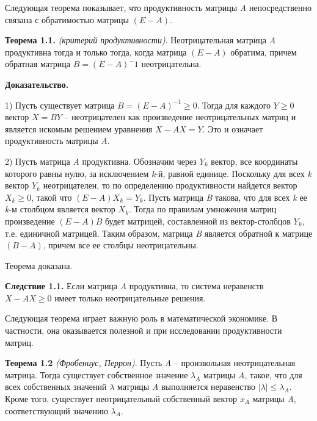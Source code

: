 \documentclass[12pt, 4paper]{book}
\begin{document}
{Следующая теорема показывает, что продуктивность матрицы \textit{A} непосредственно связана с обратимостью матрицы $ (E - A) $.
\par

\textbf{Теорема 1.1.} \textit{(критерий продуктивности)}. Неотрицательная матрица \textit{A} продуктивна тогда и только тогда, когда матрица $ (E - A) $ обратима, причем обратная матрица $ B = (E - A)^-1 $ неотрицательна.
\par

\textbf{Доказательство.} 
\par

1) Пусть существует матрица $ B = (E - A)^{-1} \geq 0$. Тогда для каждого $ Y \geq 0 $ вектор $ X = BY $ – неотрицателен как произведение неотрицательных матриц и является искомым решением уравнения $ X - AX = Y $. Это и означает продуктивность матрицы \textit{A}.
\par

2) Пусть матрица \textit{A} продуктивна. Обозначим через $ Y_k $ вектор, все координаты которого равны нулю, за исключением \textit{k}-й, равной единице. Поскольку для всех \textit{k} вектор $ Y_k $ неотрицателен, то по определению продуктивности найдется вектор $ X_k \geq 0 $, такой что $ (E - A)X_k = Y_k $. Пусть матрица \textit{B} такова, что для всех \textit{k} ее \textit{k}-м столбцом является вектор $ X_k $. Тогда по правилам умножения матриц произведение $ (E - A)B $ будет матрицей, составленной из вектор-столбцов $ Y_k $, т.е. единичной матрицей. Таким образом, матрица \textit{B} является обратной к матрице $ (B - A) $, причем все ее столбцы неотрицательны.
\par

Теорема доказана.
\par

\textbf{Следствие 1.1.} Если матрица \textit{A} продуктивна, то система неравенств $ X - AX \geq 0 $ имеет только неотрицательные решения.
\par

Следующая теорема играет важную роль в математической экономике. В частности, она оказывается полезной и при исследовании продуктивности матриц.
\par

\textbf{Теорема 1.2} \textit{(Фробениус, Перрон)}. Пусть \textit{A} – произвольная неотрицательная матрица. Тогда существует собственное значение $ \lambda_{A} $ матрицы \textit{A}, такое, что для всех собственных значений $ \lambda $ матрицы \textit{A} выполняется неравенство $ |\lambda| \leq \lambda_{A} $. Кроме того, существует неотрицательный собственный вектор $ x_A $ матрицы \textit{A}, соответствующий значению $ \lambda_{A} $.
\par

}
\end{document}
